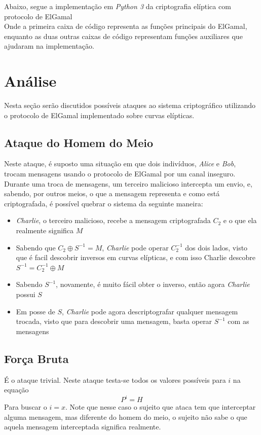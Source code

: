 \documentclass[14pt, oneside]{book}
\newcommand\tab[1][1cm]{\hspace*{#1}}
\theoremstyle{definition}
\begin{document}
                \tab Abaixo, segue a implementação em \textit{Python 3} da criptografia elíptica com protocolo de ElGamal
                \\
                \tab Onde a primeira caixa de código representa as funções principais do ElGamal, enquanto as duas outras caixas de código representam funções auxiliares que ajudaram na implementação.
                
        
        \chapter{Análise}
            Nesta seção serão discutidos possíveis ataques ao sistema criptográfico utilizando o protocolo de ElGamal implementado sobre curvas elípticas.
            \section{Ataque do Homem do Meio}
                Neste ataque, é suposto uma situação em que dois indivíduos, \textit{Alice} e \textit{Bob}, trocam mensagens usando o protocolo de ElGamal por um canal inseguro. Durante uma troca de mensagens, um terceiro malicioso intercepta um envio, e, sabendo, por outros meios, o que a mensagem representa e como está criptografada, é possível quebrar o sistema da seguinte maneira:
                \begin{itemize}
                    \item \textit{Charlie}, o terceiro malicioso, recebe a mensagem criptografada $C_2$ e o que ela realmente significa $M$ 
                    \item Sabendo que $C_2 \oplus S^{-1} = M$, \textit{Charlie} pode operar $C_2^{-1}$ dos dois lados, visto que é facil descobrir inversos em curvas elípticas, e com isso Charlie descobre $S^{-1} = C_2^{-1}\oplus M$
                    \item Sabendo $S^{-1}$, novamente, é muito fácil obter o inverso, então agora \textit{Charlie} possui $S$
                    \item Em posse de $S$, \textit{Charlie} pode agora descriptografar qualquer mensagem trocada, visto que para descobrir uma mensagem, basta operar $S^{-1}$ com as mensagens
                \end{itemize}
                
            \section{Força Bruta}
                É o ataque trivial. Neste ataque testa-se todos os valores possíveis para $i$ na equação 
                $$P^i = H$$
                Para buscar o $i = x$. Note que nesse caso o sujeito que ataca tem que interceptar alguma mensagem, mas diferente do homem do meio, o sujeito não sabe o que aquela mensagem interceptada significa realmente.
                
\end{document}
